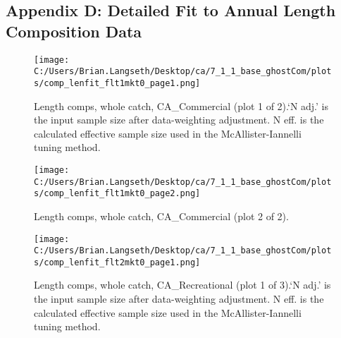 \documentclass[11pt,
  english,
  a4paper,
]{article}
\begin{document}
\clearpage


\hypertarget{append_d}{%
\subsection{Appendix D: Detailed Fit to Annual Length Composition Data}\label{append_d}}

\leavevmode\tagmcend\tagstructend


\begin{figure}
\centering
\texttt{[image: C:/Users/Brian.Langseth/Desktop/ca/7\_1\_1\_base\_ghostCom/plots/comp\_lenfit\_flt1mkt0\_page1.png]}
\caption{Length comps, whole catch, CA\_Commercial (plot 1 of 2).`N adj.' is the input sample size after data-weighting adjustment. N eff. is the calculated effective sample size used in the McAllister-Iannelli tuning method.\label{fig:comp_lenfit_flt1mkt0_page1}}
\end{figure}

\tagmcend\tagstructend


\begin{figure}
\centering
\texttt{[image: C:/Users/Brian.Langseth/Desktop/ca/7\_1\_1\_base\_ghostCom/plots/comp\_lenfit\_flt1mkt0\_page2.png]}
\caption{Length comps, whole catch, CA\_Commercial (plot 2 of 2).\label{fig:comp_lenfit_flt1mkt0_page2}}
\end{figure}

\tagmcend\tagstructend


\begin{figure}
\centering
\texttt{[image: C:/Users/Brian.Langseth/Desktop/ca/7\_1\_1\_base\_ghostCom/plots/comp\_lenfit\_flt2mkt0\_page1.png]}
\caption{Length comps, whole catch, CA\_Recreational (plot 1 of 3).`N adj.' is the input sample size after data-weighting adjustment. N eff. is the calculated effective sample size used in the McAllister-Iannelli tuning method.\label{fig:comp_lenfit_flt2mkt0_page1}}
\end{figure}
\end{document}
